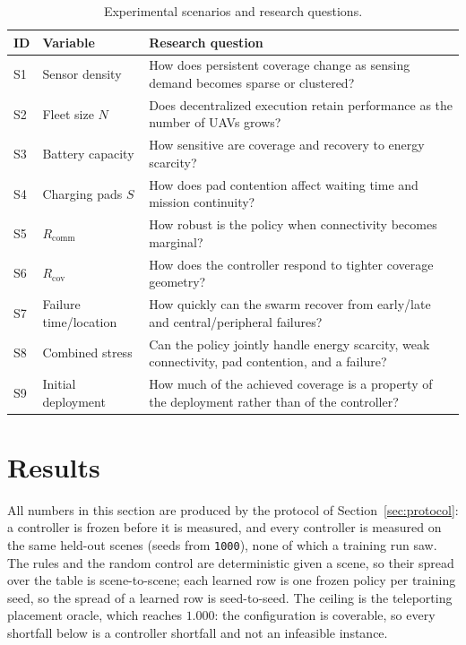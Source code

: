 \documentclass[conference]{IEEEtran}
\begin{document}
\begin{table}[t]
\caption{Experimental scenarios and research questions.}
\label{tab:scenarios}
\centering
\scriptsize
\renewcommand{\arraystretch}{1.06}
\begin{tabularx}{\columnwidth}{@{}L{0.65cm}L{1.75cm}Y@{}}
\toprule
ID & Variable & Research question \\
\midrule
S1 & Sensor density & How does persistent coverage change as sensing demand becomes sparse or clustered? \\
S2 & Fleet size $N$ & Does decentralized execution retain performance as the number of UAVs grows? \\
S3 & Battery capacity & How sensitive are coverage and recovery to energy scarcity? \\
S4 & Charging pads $S$ & How does pad contention affect waiting time and mission continuity? \\
S5 & $R_{\mathrm{comm}}$ & How robust is the policy when connectivity becomes marginal? \\
S6 & $R_{\mathrm{cov}}$ & How does the controller respond to tighter coverage geometry? \\
S7 & Failure time/location & How quickly can the swarm recover from early/late and central/peripheral failures? \\
S8 & Combined stress & Can the policy jointly handle energy scarcity, weak connectivity, pad contention, and a failure? \\
S9 & Initial deployment & How much of the achieved coverage is a property of the deployment rather than of the controller? \\
\bottomrule
\end{tabularx}
\end{table}





\section{Results}
\label{sec:results}

All numbers in this section are produced by the protocol of
Section~\ref{sec:protocol}: a controller is frozen before it is measured, and
every controller is measured on the same \tokRuleScenes{} held-out scenes
(seeds from \texttt{1000}), none of which a training run saw.  The rules and
the random control are deterministic given a scene, so their spread over the
table is scene-to-scene; each learned row is one frozen policy per training
seed, so the spread of a learned row is seed-to-seed.  The ceiling is the
teleporting placement oracle, which reaches $1.000$: the configuration is
coverable, so every shortfall below is a controller shortfall and not an
infeasible instance.
\end{document}

